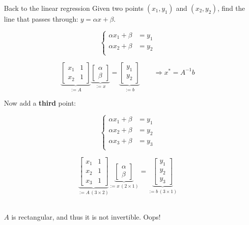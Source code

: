 \documentclass[UKenglish,aspectratio=169]{beamer}
\begin{document}
\begin{frame}{Back to the linear regression}
Given two points $(x_1, y_1)$ and $(x_2, y_2)$, find the line that passes through: $y = \alpha x + \beta$.
\pause
\begin{minipage}{.45\linewidth}
$$
\left\{
\begin{split}
\alpha x_1 + \beta &= y_1\\
\alpha x_2 + \beta &= y_2\\
\end{split}
\right.
$$
\end{minipage}
\pause
\begin{minipage}{.45\linewidth}
$$
\underbrace{\begin{bmatrix}x_1  & 1 \\ x_2 & 1 \end{bmatrix}}_{:=A}
\underbrace{\begin{bmatrix} \alpha \\ \beta \end{bmatrix}}_{:=x} = \underbrace{\begin{bmatrix} y_1 \\ y_2 \end{bmatrix}}_{:=b}
\qquad
\Rightarrow x^* = A^{-1}b
$$
\end{minipage}

\pause
Now add a \textbf{third} point:\\
\begin{minipage}{.45\linewidth}
$$
\left\{
\begin{split}
\alpha x_1 + \beta &= y_1\\
\alpha x_2 + \beta &= y_2\\
\alpha x_3 + \beta &= y_3\\
\end{split}
\right.
$$
\end{minipage}\pause
\begin{minipage}{.45\linewidth}
$$
\underbrace{\begin{bmatrix}x_1  & 1 \\ x_2 & 1 \\x_3 & 1 \end{bmatrix} }_{:= A\,(3\times 2)}
\underbrace{\begin{bmatrix} \alpha \\ \beta \end{bmatrix}}_{:=x\,(2\times 1)} = \underbrace{\begin{bmatrix} y_1 \\ y_2 \\ y_3 \end{bmatrix}}_{:=b\, (3\times 1)}
$$
\end{minipage}

~\\

$A$ is rectangular, and thus it is not invertible. Oops!
\end{frame}
\end{document}
